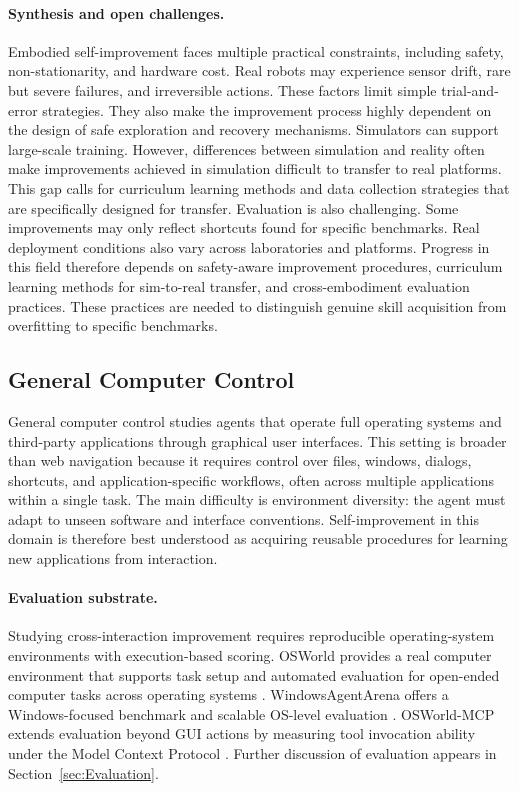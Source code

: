 \paragraph{Synthesis and open challenges.}
Embodied self-improvement faces multiple practical constraints, including safety, non-stationarity, and hardware cost. Real robots may experience sensor drift, rare but severe failures, and irreversible actions. These factors limit simple trial-and-error strategies. They also make the improvement process highly dependent on the design of safe exploration and recovery mechanisms. Simulators can support large-scale training. However, differences between simulation and reality often make improvements achieved in simulation difficult to transfer to real platforms. This gap calls for curriculum learning methods and data collection strategies that are specifically designed for transfer. Evaluation is also challenging. Some improvements may only reflect shortcuts found for specific benchmarks. Real deployment conditions also vary across laboratories and platforms. Progress in this field therefore depends on safety-aware improvement procedures, curriculum learning methods for sim-to-real transfer, and cross-embodiment evaluation practices. These practices are needed to distinguish genuine skill acquisition from overfitting to specific benchmarks.


\subsection{General Computer Control}

General computer control studies agents that operate full operating systems and third-party applications through graphical user interfaces. This setting is broader than web navigation because it requires control over files, windows, dialogs, shortcuts, and application-specific workflows, often across multiple applications within a single task. The main difficulty is environment diversity: the agent must adapt to unseen software and interface conventions. Self-improvement in this domain is therefore best understood as acquiring reusable procedures for learning new applications from interaction.

\paragraph{Evaluation substrate.}
Studying cross-interaction improvement requires reproducible operating-system environments with execution-based scoring. OSWorld provides a real computer environment that supports task setup and automated evaluation for open-ended computer tasks across operating systems \citep{xie2024osworldbenchmarkingmultimodalagents}. WindowsAgentArena offers a Windows-focused benchmark and scalable OS-level evaluation \citep{bonatti2024windowsagentarenaevaluating}. OSWorld-MCP extends evaluation beyond GUI actions by measuring tool invocation ability under the Model Context Protocol \citep{jia2025osworldmcpbenchmarkingmcptool}. Further discussion of evaluation appears in Section~\ref{sec:Evaluation}.

